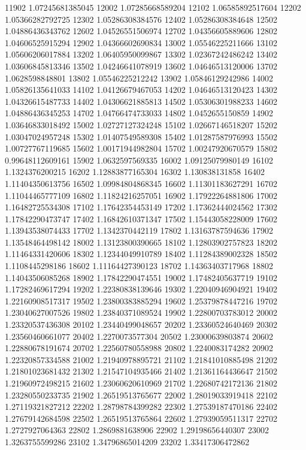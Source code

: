 {11902 1.07245681385045
12002 1.07285668589204
12102 1.06585892517604
12202 1.05366282792725
12302 1.05286308384576
12402 1.05286308384648
12502 1.04886436343762
12602 1.04526551506974
12702 1.04356605889606
12802 1.04606525915294
12902 1.04366602690834
13002 1.05546225211666
13102 1.05606206017884
13202 1.06405950099867
13302 1.02367242486242
13402 1.03606845813346
13502 1.04246641078919
13602 1.04646513120006
13702 1.0628598848801
13802 1.05546225212242
13902 1.05846129242986
14002 1.05826135641033
14102 1.04126679467053
14202 1.04646513120423
14302 1.04326615487733
14402 1.04306621885813
14502 1.05306301988233
14602 1.04886436345253
14702 1.04766474733033
14802 1.0452655150859
14902 1.03646833018492
15002 1.02727127324248
15102 1.02667146518207
15202 1.03047024957248
15302 1.01407549589308
15402 1.01287587976993
15502 1.00727767119685
15602 1.00171944982804
15702 1.00247920670579
15802 0.99648112609161
15902 1.0632597569335
16002 1.09125079980149
16102 1.1324376200215
16202 1.12883877165304
16302 1.130838131858
16402 1.11404350613756
16502 1.09984804868345
16602 1.11301183627291
16702 1.11044465777109
16802 1.11824216257051
16902 1.17922264881806
17002 1.16482725534308
17102 1.17642354453149
17202 1.17362444024562
17302 1.17842290473747
17402 1.16842610371347
17502 1.15443058228009
17602 1.13943538074433
17702 1.1342370442119
17802 1.13163787594636
17902 1.13548464498142
18002 1.13123800390665
18102 1.12803902757823
18202 1.11464331420606
18302 1.12344049910789
18402 1.11284389002328
18502 1.1108445298186
18602 1.11164427390123
18702 1.14363403717968
18802 1.14043506085268
18902 1.17842290474551
19002 1.17482405637719
19102 1.17282469617294
19202 1.22380838139646
19302 1.22040946904921
19402 1.22160908517317
19502 1.23800383885294
19602 1.25379878447216
19702 1.23040627007526
19802 1.23840371089524
19902 1.22800703783012
20002 1.23320537436308
20102 1.23440499048657
20202 1.23360524640469
20302 1.23560460661077
20402 1.2270073577304
20502 1.23000639803874
20602 1.22880678191674
20702 1.22560780558988
20802 1.2240083174282
20902 1.22320857334588
21002 1.21940978895721
21102 1.21841010885498
21202 1.21801023681432
21302 1.21547104935466
21402 1.21361164436647
21502 1.21960972498215
21602 1.23060620610969
21702 1.22680742172136
21802 1.23280550233735
21902 1.26519513765677
22002 1.28019033919418
22102 1.27119321827212
22202 1.28798784399282
22302 1.27539187470186
22402 1.27679142684598
22502 1.26519513765864
22602 1.27939059511317
22702 1.2727927064363
22802 1.2869881638906
22902 1.29198656440307
23002 1.3263755599286
23102 1.34796865014209
23202 1.33417306472862
}
